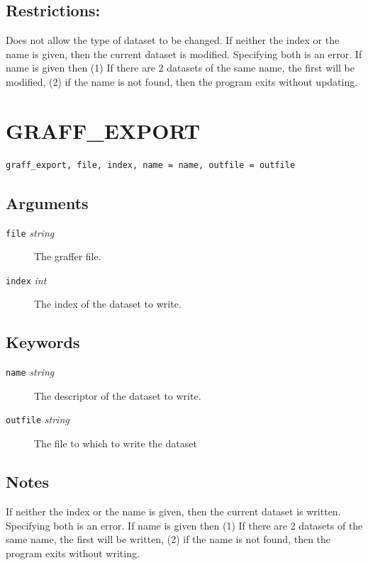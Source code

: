 \documentclass[11pt,twoside,english]{article}
\begin{document}
\subsection{Restrictions:}
\label{sec:gu-restr}

Does not allow the type of dataset to be changed.  If neither the index
or the name is given, then the current dataset is modified.  Specifying
both is an error.  If name is given then (1) If there are 2 datasets of
the same name, the first will be modified, (2) if the name is not
found, then the program exits without updating.

\section{GRAFF\_EXPORT}
\label{sec:graff_export}


\begin{verbatim}
graff_export, file, index, name = name, outfile = outfile
\end{verbatim}

\subsection{Arguments}
\label{sec:ge-args}

\begin{description}
\item[\texttt{file} \textit{string}] The graffer file.
\item[\texttt{index} \textit{int}] The index of the dataset to write.
\end{description}

\subsection{Keywords}
\label{sec:ge-keys}

\begin{description}
\item[\texttt{name}	\textit{string}] The descriptor of the dataset to write.
\item[\texttt{outfile}	\textit{string}] The file to which to write the dataset
\end{description}

\subsection{Notes}
\label{sec:ge-notes}

If neither the index or the name is given, then the current dataset is
written.  Specifying both is an error.  If name is given then (1) If
there are 2 datasets of the same name, the first will be written, (2)
if the name is not found, then the program exits without writing.
\end{document}

